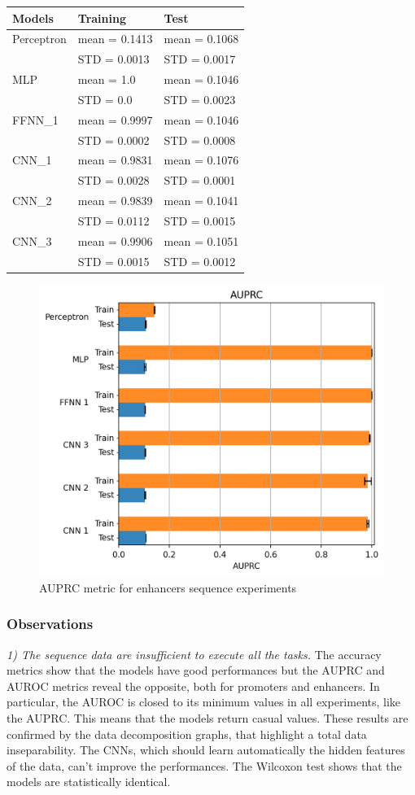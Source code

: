 \begin{longtable}[]{@{}lll@{}}
\toprule
\textbf{Models} & \textbf{Training} & \textbf{Test}\tabularnewline
\midrule
\endhead
Perceptron & mean = 0.1413 & mean = 0.1068\tabularnewline
& STD = 0.0013 & STD = 0.0017\tabularnewline
MLP & mean = 1.0 & mean = 0.1046\tabularnewline
& STD = 0.0 & STD = 0.0023\tabularnewline
FFNN\_1 & mean = 0.9997 & mean = 0.1046\tabularnewline
& STD = 0.0002 & STD = 0.0008\tabularnewline
CNN\_1 & mean = 0.9831 & mean = 0.1076\tabularnewline
& STD = 0.0028 & STD = 0.0001\tabularnewline
CNN\_2 & mean = 0.9839 & mean = 0.1041\tabularnewline
& STD = 0.0112 & STD = 0.0015\tabularnewline
CNN\_3 & mean = 0.9906 & mean = 0.1051\tabularnewline
& STD = 0.0015 & STD = 0.0012\tabularnewline
\bottomrule
\end{longtable}

\begin{figure}[h!]
\centering
\includegraphics[width=0.8\linewidth]{../images/sequence_results/enhancers/auprc.png}
\caption{AUPRC metric for enhancers sequence experiments}
\end{figure}

\subsubsection{Observations}\label{header-n1829}

\emph{1) The sequence data are insufficient to execute all the tasks.}
The accuracy metrics show that the models have good performances but the
AUPRC and AUROC metrics reveal the opposite, both for promoters and
enhancers. In particular, the AUROC is closed to its minimum values in
all experiments, like the AUPRC. This means that the models return
casual values. These results are confirmed by the data decomposition
graphs, that highlight a total data inseparability. The CNNs, which
should learn automatically the hidden features of the data, can't
improve the performances. The Wilcoxon test shows that the models are statistically identical.

